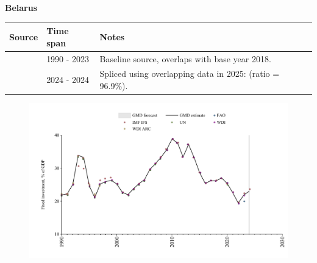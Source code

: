 \documentclass[12pt,a4paper,landscape]{article}
\begin{document}
\begin{adjustbox}{max totalsize={\paperwidth}{\paperheight},center}
\begin{minipage}[t][\textheight][t]{\textwidth}
\vspace*{0.5cm}
{}
\begin{center}
{\Large\bfseries Belarus}
\end{center}
\vspace{0.5cm}
\begin{table}[H]
\centering
\small
\begin{tabular}{|l|l|l|}
\hline
\textbf{Source} & \textbf{Time span} & \textbf{Notes} \\
\hline
\rowcolor{white}\cite{WDI}& 1990 - 2023 &Baseline source, overlaps with base year 2018.\\
\rowcolor{lightgray}\cite{IMF_IFS}& 2024 - 2024 &Spliced using overlapping data in 2025: (ratio = 96.9\%).\\
\hline
\end{tabular}
\end{table}
\begin{figure}[H]
\centering
\includegraphics[width=\textwidth,height=0.6\textheight,keepaspectratio]{graphs/BLR_finv_GDP.pdf}
\end{figure}
\end{minipage}
\end{adjustbox}
\end{document}
